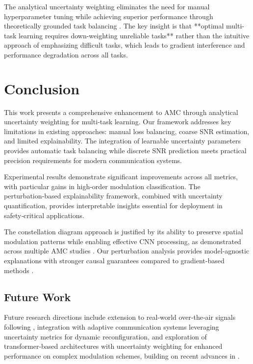 \documentclass{ELSP}
\begin{document}
The analytical uncertainty weighting eliminates the need for manual hyperparameter tuning while achieving superior performance through theoretically grounded task balancing \cite{kendall2018multi,liu2024analytical}. The key insight is that **optimal multi-task learning requires down-weighting unreliable tasks** rather than the intuitive approach of emphasizing difficult tasks, which leads to gradient interference and performance degradation across all tasks.

\section{Conclusion}

This work presents a comprehensive enhancement to AMC through analytical uncertainty weighting for multi‑task learning. Our framework addresses key limitations in existing approaches: manual loss balancing, coarse SNR estimation, and limited explainability. The integration of learnable uncertainty parameters provides automatic task balancing while discrete SNR prediction meets practical precision requirements for modern communication systems.

Experimental results demonstrate significant improvements across all metrics, with particular gains in high‑order modulation classification. The perturbation‑based explainability framework, combined with uncertainty quantification, provides interpretable insights essential for deployment in safety‑critical applications.

The constellation diagram approach is justified by its ability to preserve spatial modulation patterns while enabling effective CNN processing, as demonstrated across multiple AMC studies \cite{peng2021survey,doan2020learning}. Our perturbation analysis provides model-agnostic explanations with stronger causal guarantees compared to gradient-based methods \cite{IVANOVS2021228}.

\subsection*{Future Work}
Future research directions include extension to real‑world over‑the‑air signals following \cite{o2018over}, integration with adaptive communication systems leveraging uncertainty metrics for dynamic reconfiguration, and exploration of transformer‑based architectures with uncertainty weighting for enhanced performance on complex modulation schemes, building on recent advances in \cite{faysal2024nmformer}.



\end{document}
